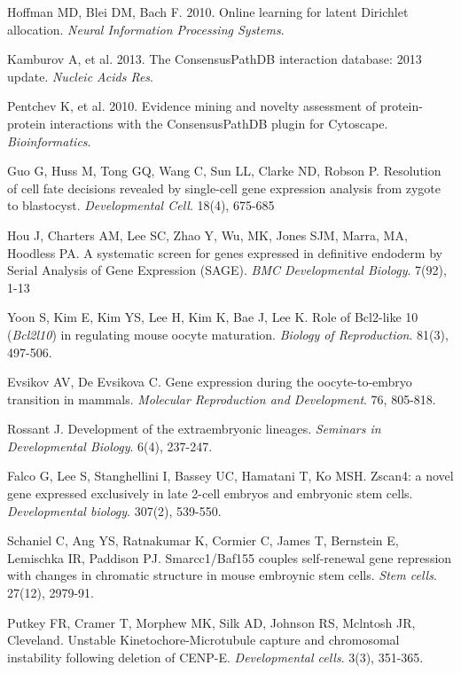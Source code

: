 \documentclass[10pt,letterpaper]{article}
\begin{document}
\begin{thebibliography}{9}
 Hoffman MD,  Blei DM,  Bach F. 2010.
 Online learning for latent Dirichlet allocation.
 \textit{Neural Information Processing Systems}.

 Kamburov A,  et al. 2013.
 The ConsensusPathDB interaction database: 2013 update.
 \textit{Nucleic Acids Res}.

 Pentchev K,  et al. 2010.
 Evidence mining and novelty assessment of protein-protein interactions with the ConsensusPathDB plugin for Cytoscape.
 \textit{Bioinformatics}.

Guo G, Huss M, Tong GQ, Wang C, Sun LL, Clarke ND, Robson P.
Resolution of cell fate decisions revealed by single-cell gene expression analysis from zygote to blastocyst. \textit{Developmental Cell}. 18(4), 675-685

Hou J, Charters AM, Lee SC, Zhao Y, Wu, MK, Jones SJM, Marra, MA, Hoodless PA.
A systematic screen for genes expressed in definitive endoderm by Serial Analysis of Gene Expression (SAGE).
\textit{BMC Developmental Biology}. 7(92), 1-13


Yoon S, Kim E, Kim YS, Lee H, Kim K, Bae J, Lee K.
Role of Bcl2-like 10 (\textit{Bcl2l10}) in regulating mouse oocyte maturation.
\textit{Biology of Reproduction}. 81(3), 497-506.

Evsikov AV, De Evsikova C.
Gene expression during the oocyte-to-embryo transition in mammals.
\textit{Molecular Reproduction and Development}. 76, 805-818.

Rossant J.
Development of the extraembryonic lineages.
\textit{Seminars in Developmental Biology}. 6(4), 237-247.

Falco G, Lee S, Stanghellini I, Bassey UC, Hamatani T, Ko MSH.
Zscan4: a novel gene expressed exclusively in late 2-cell embryos and embryonic stem cells.
\textit{Developmental biology}. 307(2), 539-550.

Schaniel C, Ang YS, Ratnakumar K, Cormier C, James T, Bernstein E, Lemischka IR, Paddison PJ.
Smarcc1/Baf155 couples self-renewal gene repression with changes in chromatic structure in mouse embroynic stem cells.
\textit{Stem cells}. 27(12), 2979-91.

Putkey FR, Cramer T, Morphew MK, Silk AD, Johnson RS, Mclntosh JR, Cleveland.
Unstable Kinetochore-Microtubule capture and chromosomal instability following deletion of CENP-E.
\textit{Developmental cells}. 3(3), 351-365.

\end{thebibliography}
\end{document}

